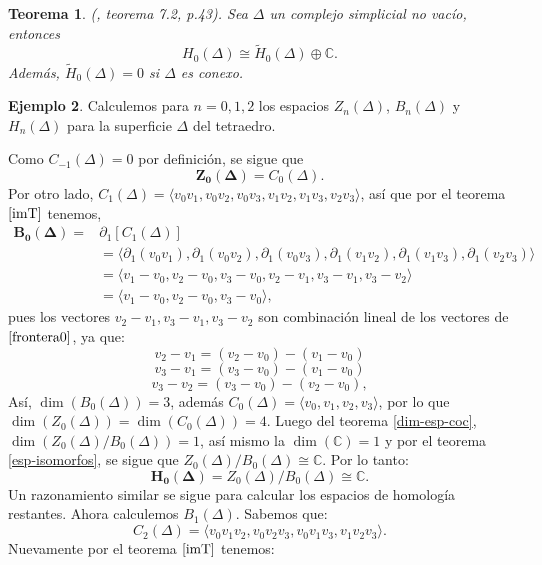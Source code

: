\documentclass[12pt]{book}
\newtheorem{theorem}{Teorema}[section]
\theoremstyle{definition}
\newtheorem{example}[theorem]{Ejemplo}
\newcounter{in}
\newcounter{ini}
\begin{document}
\begin{theorem}{\normalfont(\cite{munkres1984elements}, teorema 7.2, p.43)}.
  Sea $\Delta$ un complejo simplicial no vacío, entonces
  $$H_{0}(\Delta)\cong \widetilde H_{0}(\Delta)\oplus
  \mathbb{C}.$$
  Además, $\widetilde H_{0}(\Delta)=0$ si $\Delta$ es conexo.
\end{theorem}

\begin{example}
  Calculemos para $n=0, 1, 2$ los espacios $Z_{n}(\Delta)$,
  $B_{n}(\Delta)$ y~$H_{n}(\Delta)$ para la superficie $\Delta$ del tetraedro.

  Como $C_{-1}(\Delta)=0$ por definición, se sigue que
  $$\boldsymbol{Z_{0}(\Delta)}=C_{0}(\Delta).$$
  Por otro lado, $C_{1}(\Delta)=\langle v_{0}v_{1},v_{0}v_{2},v_{0}v_{3},v_{1}v_{2},v_{1}v_{3},v_{2}v_{3}\rangle$,
  así que por el teorema $\ref{imT}$ tenemos, 
  \begin{align}
    \label{frontera0}
    \boldsymbol{B_{0}(\Delta)}=&\partial_{1}[C_{1}(\Delta)]\nonumber\\
    &=\langle \partial_{1}(v_{0}v_{1}),\partial_{1}(v_{0}v_{2}),\partial_{1}(v_{0}v_{3}),\partial_{1}(v_{1}v_{2}),\partial_{1}(v_{1}v_{3}),\partial_{1}(v_{2}v_{3})\rangle\nonumber\\
    &=\langle v_{1}-v_{0},v_{2}-v_{0},v_{3}-v_{0},v_{2}-v_{1},v_{3}-v_{1},v_{3}-v_{2}\rangle\nonumber\\
    &=\langle v_{1}-v_{0},v_{2}-v_{0},v_{3}-v_{0}\rangle,
  \end{align} 
  pues los vectores $v_{2}-v_{1}, v_{3}-v_{1}, v_{3}-v_{2}$ son
  combinación lineal de los vectores de $\ref{frontera0}$, ya que:
  $$v_{2}-v_{1}=(v_{2}-v_{0})-(v_{1}-v_{0})$$
  $$v_{3}-v_{1}=(v_{3}-v_{0})-(v_{1}-v_{0})$$
  $$v_{3}-v_{2}=(v_{3}-v_{0})-(v_{2}-v_{0}),$$
  Así, $\dim(B_{0}(\Delta))=3$, además $C_{0}(\Delta)=\langle
  v_{0},v_{1},v_{2},v_{3}\rangle$, por lo que
 $\dim(Z_{0}(\Delta))=\dim(C_{0}(\Delta))=4$. Luego del teorema
 \ref{dim-esp-coc}, $\dim(Z_{0}(\Delta)/B_{0}(\Delta))=1$, así mismo
 la $\dim(\mathbb{C})=1$ y por el teorema \ref{esp-isomorfos}, se
 sigue que $Z_{0}(\Delta)/B_{0}(\Delta)\cong \mathbb{C}$.
 Por lo tanto:
 $$\boldsymbol{H_{0}(\Delta)}=Z_{0}(\Delta)/B_{0}(\Delta)\cong \mathbb{C}.$$
 Un razonamiento similar se sigue para calcular los espacios de homología restantes.
 Ahora calculemos $B_{1}(\Delta)$. Sabemos que:
 $$C_{2}(\Delta)=\langle
 v_{0}v_{1}v_{2},v_{0}v_{2}v_{3},v_{0}v_{1}v_{3},v_{1}v_{2}v_{3}\rangle.$$
 Nuevamente por el teorema $\ref{imT}$ tenemos:
 \begin{align}  

\end{align}
\end{example}
\end{document}
